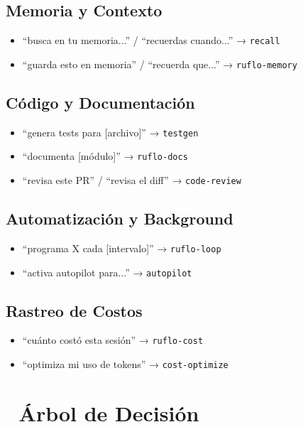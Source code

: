 \documentclass[11pt,a4paper,spanish]{article}
\begin{document}
\subsection*{Memoria y Contexto}
\begin{itemize}
  \item ``busca en tu memoria...'' / ``recuerdas cuando...'' → \texttt{recall}
  \item ``guarda esto en memoria'' / ``recuerda que...'' → \texttt{ruflo-memory}
\end{itemize}

\subsection*{Código y Documentación}
\begin{itemize}
  \item ``genera tests para [archivo]'' → \texttt{testgen}
  \item ``documenta [módulo]'' → \texttt{ruflo-docs}
  \item ``revisa este PR'' / ``revisa el diff'' → \texttt{code-review}
\end{itemize}

\subsection*{Automatización y Background}
\begin{itemize}
  \item ``programa X cada [intervalo]'' → \texttt{ruflo-loop}
  \item ``activa autopilot para...'' → \texttt{autopilot}
\end{itemize}

\subsection*{Rastreo de Costos}
\begin{itemize}
  \item ``cuánto costó esta sesión'' → \texttt{ruflo-cost}
  \item ``optimiza mi uso de tokens'' → \texttt{cost-optimize}
\end{itemize}

\section{🌳 Árbol de Decisión}

\vspace{0.2cm}
\end{document}
